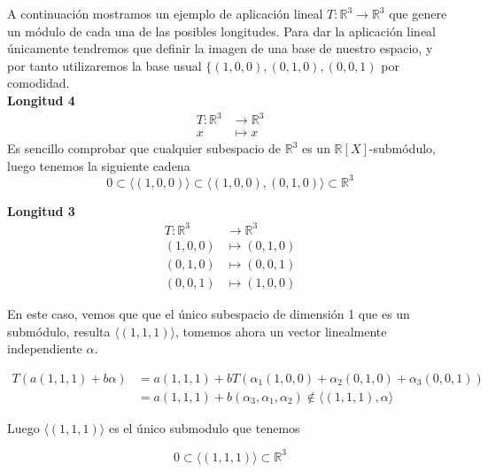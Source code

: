 A continuación mostramos un ejemplo de aplicación lineal \(T:\mathbb{R}^3 \rightarrow \mathbb{R}^3\) que genere un módulo de cada una de las posibles longitudes.
Para dar la aplicación lineal únicamente tendremos que definir la imagen de una base de nuestro espacio, y por tanto utilizaremos la base usual
\(\{(1,0,0), (0,1,0), (0,0,1)\) por comodidad.\\

\textbf{Longitud 4}%
\[
\begin{aligned}
  T:\mathbb{R}^3 &\rightarrow \mathbb{R}^3\\
  x &\mapsto x
\end{aligned}
\]
Es sencillo comprobar que cualquier subespacio de \(\mathbb{R}^3\) es un
\(\mathbb{R}[X]\)-submódulo, luego tenemos la siguiente cadena
\[
        0 \subset \langle (1,0,0) \rangle \subset \langle (1,0,0), (0,1,0)
        \rangle \subset \mathbb{R}^3
\]

\textbf{Longitud 3}%
\[
\begin{aligned}
  T:\mathbb{R}^3 &\rightarrow \mathbb{R}^3\\
  (1,0,0) &\mapsto (0,1,0)\\
  (0,1,0) &\mapsto (0,0,1)\\
  (0,0,1) &\mapsto (1,0,0)
\end{aligned}
\]

En este caso, vemos que que el único subespacio de dimensión 1 que es un
submódulo, resulta \(\langle (1,1,1) \rangle\), tomemos ahora un vector
linealmente independiente \(\alpha\).

\[
  \begin{aligned}
  T(a(1,1,1) + b\alpha) &= a(1,1,1) + bT(\alpha_1(1,0,0) + \alpha_2(0,1,0) +
  \alpha_3(0,0,1))\\
  &= a(1,1,1) + b(\alpha_3, \alpha_1, \alpha_2) \not \in
  \langle(1,1,1),\alpha\rangle
  \end{aligned}
\]

Luego \(\langle (1,1,1)\rangle\) es el único submodulo que tenemos

\[
        0 \subset \langle (1,1,1) \rangle \subset \mathbb{R}^3
\]
